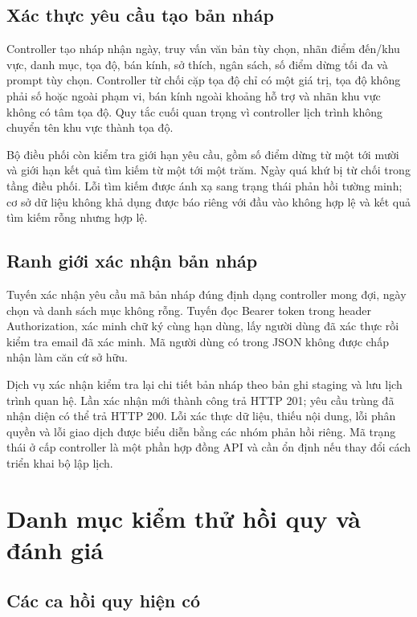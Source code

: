 \section{Xác thực yêu cầu tạo bản nháp}

Controller tạo nháp nhận ngày, truy vấn văn bản tùy chọn, nhãn điểm đến/khu vực, danh mục, tọa độ, bán kính, sở thích, ngân sách, số điểm dừng tối đa và prompt tùy chọn. Controller từ chối cặp tọa độ chỉ có một giá trị, tọa độ không phải số hoặc ngoài phạm vi, bán kính ngoài khoảng hỗ trợ và nhãn khu vực không có tâm tọa độ. Quy tắc cuối quan trọng vì controller lịch trình không chuyển tên khu vực thành tọa độ.

Bộ điều phối còn kiểm tra giới hạn yêu cầu, gồm số điểm dừng từ một tới mười và giới hạn kết quả tìm kiếm từ một tới một trăm. Ngày quá khứ bị từ chối trong tầng điều phối. Lỗi tìm kiếm được ánh xạ sang trạng thái phản hồi tường minh; cơ sở dữ liệu không khả dụng được báo riêng với đầu vào không hợp lệ và kết quả tìm kiếm rỗng nhưng hợp lệ.

\section{Ranh giới xác nhận bản nháp}

Tuyến xác nhận yêu cầu mã bản nháp đúng định dạng controller mong đợi, ngày chọn và danh sách mục không rỗng. Tuyến đọc Bearer token trong header Authorization, xác minh chữ ký cùng hạn dùng, lấy người dùng đã xác thực rồi kiểm tra email đã xác minh. Mã người dùng có trong JSON không được chấp nhận làm căn cứ sở hữu.

Dịch vụ xác nhận kiểm tra lại chi tiết bản nháp theo bản ghi staging và lưu lịch trình quan hệ. Lần xác nhận mới thành công trả HTTP 201; yêu cầu trùng đã nhận diện có thể trả HTTP 200. Lỗi xác thực dữ liệu, thiếu nội dung, lỗi phân quyền và lỗi giao dịch được biểu diễn bằng các nhóm phản hồi riêng. Mã trạng thái ở cấp controller là một phần hợp đồng API và cần ổn định nếu thay đổi cách triển khai bộ lập lịch.

\chapter{Danh mục kiểm thử hồi quy và đánh giá}
\label{app:evaluation}

\section{Các ca hồi quy hiện có}

